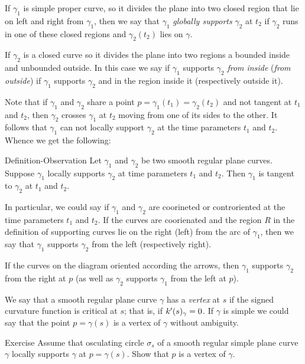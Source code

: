 If $\gamma_1$ is simple proper curve, so it divides the plane into two closed region that lie on left and right from $\gamma_1$, then we say that $\gamma_1$ \emph{globally supports} $\gamma_2$ at $t_2$ 
if $\gamma_2$ runs in one of these closed regions and 
$\gamma_2(t_2)$ lies on $\gamma$.

If $\gamma_2$ is a closed curve so it divides the plane into two regions a bounded inside and unbounded outside.
In this case we say if $\gamma_1$ supports $\gamma_2$ \emph{from inside} (\emph{from outside}) if $\gamma_1$ supports $\gamma_2$ and in the region inside it (respectively outside it). 

Note that if $\gamma_1$ and $\gamma_2$ share a point $p=\gamma_1(t_1)=\gamma_2(t_2)$ and not tangent at $t_1$ and $t_2$, then  $\gamma_2$ crosses $\gamma_1$ at $t_2$ moving from one of its sides to the other.
It follows that $\gamma_1$ can not locally support $\gamma_2$ at the time parameters $t_1$ and $t_2$.
Whence we get the following:

\begin{thm}{Definition-Observation}
Let $\gamma_1$ and $\gamma_2$ be two smooth regular plane curves.
Suppose $\gamma_1$ locally supports $\gamma_2$ at time parameters $t_1$ and $t_2$.
Then $\gamma_1$ is tangent to $\gamma_2$ at $t_1$ and $t_2$.

In particular, we could say if $\gamma_1$ and $\gamma_2$ are coorineted or controriented at the time parameters $t_1$ and $t_2$.
If the curves are coorienated and the region $R$ in the definition of supporting curves lie on the right (left) from the arc of $\gamma_1$, then we say that 
$\gamma_1$ supports $\gamma_2$ from the left (respectively right).
\end{thm}

If the curves on the diagram oriented according the arrows, then $\gamma_1$ supports $\gamma_2$ from the right at $p$ (as well as $\gamma_2$ supports $\gamma_1$ from the left at $p$).

We say that a smooth regular plane curve $\gamma$ has a \emph{vertex} at $s$
if the signed curvature function is critical at $s$;
that is, if $k'(s)_\gamma=0$.
If $\gamma$ is simple we could say that the point $p=\gamma(s)$ is a vertex of $\gamma$ without ambiguity.

\begin{thm}{Exercise}\label{ex:vertex-support}
Assume that osculating circle $\sigma_s$ of a smooth regular simple plane curve $\gamma$ locally supports $\gamma$ at $p=\gamma(s)$.
Show that $p$ is a vertex of $\gamma$.
\end{thm}

